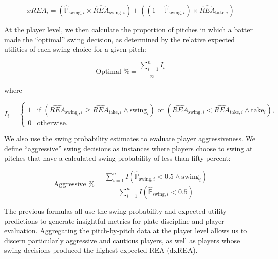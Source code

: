 \documentclass[12pt]{article}
\numberwithin{equation}{section}
\begin{document}
\begin{equation}
xREA_i = (\hat{\mathbb{P}}_{\text{swing}, i} \times \widehat{REA}_{\text{swing}, i}) + ((1 - \hat{\mathbb{P}}_{\text{swing}, i}) \times \widehat{REA}_{\text{take}, i})
\end{equation}

\vspace{5mm} %

At the player level, we then calculate the proportion of pitches in which a batter made the “optimal” swing decision, as determined by the relative expected utilities of each swing choice for a given pitch:

\begin{equation}
\text{Optimal \%} = \frac{\sum_{i=1}^{n} I_i}{n}
\end{equation}

where

\begin{equation}
I_i = 
\begin{cases} 
1 & \text{if } (\widehat{REA}_{\text{swing}_i, i} \geq \widehat{REA}_{\text{take}, i} \land \text{swing}_i) \text{ or } (\widehat{REA}_{\text{swing}, i} < \widehat{REA}_{\text{take}, i} \land \text{take}_i), \\
0 & \text{otherwise}.
\end{cases}    
\end{equation}
 
\vspace{5mm} %

We also use the swing probability estimates to evaluate player aggressiveness. We define “aggressive” swing decisions as instances where players choose to swing at pitches that have a calculated swing probability of less than fifty percent:

\begin{equation}
\text{Aggressive \%} = \frac{\sum_{i=1}^{n} I(\hat{\mathbb{P}}_{\text{swing}, i} < 0.5 \land \text{swing}_i)}{\sum_{i=1}^{n} I(\hat{\mathbb{P}}_{\text{swing}, i} < 0.5)}
\end{equation}

\vspace{5mm} %

The previous formulas all use the swing probability and expected utility predictions to generate insightful metrics for plate discipline and player evaluation. Aggregating the pitch-by-pitch data at the player level allows us to discern  particularly aggressive and cautious players, as well as players whose swing decisions produced the highest expected REA (dxREA).
\end{document}
